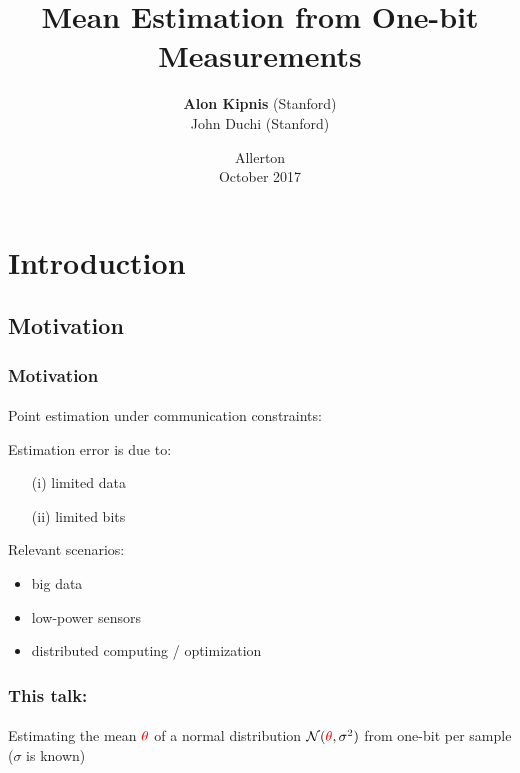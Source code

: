 \documentclass[mathserif]{beamer}
\title{Mean Estimation from One-bit Measurements}
\author{
\textbf{Alon Kipnis} (Stanford) \\
John Duchi (Stanford)\\ 
}
\date[Allerton 2017]{Allerton \\ October 2017}
\newcommand{\thetac}{{\color{red} \theta}}
\begin{document}
\graphicspath{{../Figs/}}

\frame[plain]{\titlepage}



\section{Introduction}


\subsection{Motivation}
\begin{frame}
\frametitle{Motivation}
\framesubtitle{}
Point estimation under communication constraints:\\
\begin{center}
\end{center}
\pause
Estimation error is due to:
\begin{itemize}
\item[(i)] limited data 
\item[(ii)] limited bits
\end{itemize}
\bigskip
\pause
Relevant scenarios:
\begin{itemize}
\pause
\item big data
\pause
\item low-power sensors 
\pause
\item distributed computing / optimization %

\end{itemize}

\end{frame}

\begin{frame}
\frametitle{This talk: }
\framesubtitle{}
Estimating the mean $\thetac$ of a normal distribution $\mathcal N(\thetac,\sigma^2)$ from one-bit per sample ($\sigma$ is known)
\bigskip

\end{frame}
%
\end{document}
